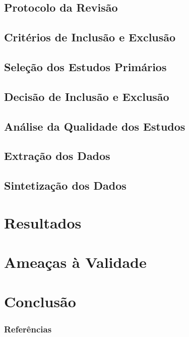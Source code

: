 \documentclass[t,14pt,mathserif]{beamer}
\begin{document}
\subsection{Protocolo da Revisão}
\subsection{Critérios de Inclusão e Exclusão}
\subsection{Seleção dos Estudos Primários}
\subsection{Decisão de Inclusão e Exclusão}
\subsection{Análise da Qualidade dos Estudos}
\subsection{Extração dos Dados}
\subsection{Sintetização dos Dados}

\section{Resultados}
\section{Ameaças à Validade}
\section{Conclusão}


\begin{frame}[allowframebreaks]
   \frametitle{Referências}
   
   
\end{frame}
\end{document}
